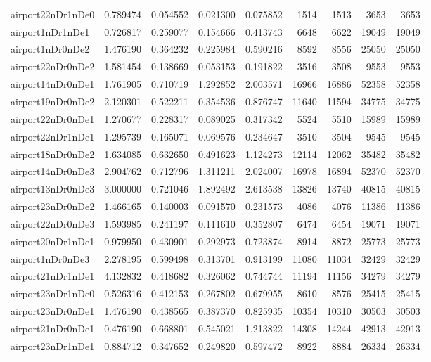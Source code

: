 \begin{longtable}{|l|r|r|r|r|r|r|r|r|}
airport22nDr1nDe0 & 0.789474 & 0.054552 & 0.021300 & 0.075852 & 1514 & 1513 & 3653 & 3653 \\
airport1nDr1nDe1 & 0.726817 & 0.259077 & 0.154666 & 0.413743 & 6648 & 6622 & 19049 & 19049 \\
airport1nDr0nDe2 & 1.476190 & 0.364232 & 0.225984 & 0.590216 & 8592 & 8556 & 25050 & 25050 \\
airport22nDr0nDe2 & 1.581454 & 0.138669 & 0.053153 & 0.191822 & 3516 & 3508 & 9553 & 9553 \\
airport14nDr0nDe1 & 1.761905 & 0.710719 & 1.292852 & 2.003571 & 16966 & 16886 & 52358 & 52358 \\
airport19nDr0nDe2 & 2.120301 & 0.522211 & 0.354536 & 0.876747 & 11640 & 11594 & 34775 & 34775 \\
airport22nDr0nDe1 & 1.270677 & 0.228317 & 0.089025 & 0.317342 & 5524 & 5510 & 15989 & 15989 \\
airport22nDr1nDe1 & 1.295739 & 0.165071 & 0.069576 & 0.234647 & 3510 & 3504 & 9545 & 9545 \\
airport18nDr0nDe2 & 1.634085 & 0.632650 & 0.491623 & 1.124273 & 12114 & 12062 & 35482 & 35482 \\
airport14nDr0nDe3 & 2.904762 & 0.712796 & 1.311211 & 2.024007 & 16978 & 16894 & 52370 & 52370 \\
airport13nDr0nDe3 & 3.000000 & 0.721046 & 1.892492 & 2.613538 & 13826 & 13740 & 40815 & 40815 \\
airport23nDr0nDe2 & 1.466165 & 0.140003 & 0.091570 & 0.231573 & 4086 & 4076 & 11386 & 11386 \\
airport22nDr0nDe3 & 1.593985 & 0.241197 & 0.111610 & 0.352807 & 6474 & 6454 & 19071 & 19071 \\
airport20nDr1nDe1 & 0.979950 & 0.430901 & 0.292973 & 0.723874 & 8914 & 8872 & 25773 & 25773 \\
airport1nDr0nDe3 & 2.278195 & 0.599498 & 0.313701 & 0.913199 & 11080 & 11034 & 32429 & 32429 \\
airport21nDr1nDe1 & 4.132832 & 0.418682 & 0.326062 & 0.744744 & 11194 & 11156 & 34279 & 34279 \\
airport23nDr1nDe0 & 0.526316 & 0.412153 & 0.267802 & 0.679955 & 8610 & 8576 & 25415 & 25415 \\
airport23nDr0nDe1 & 1.476190 & 0.438565 & 0.387370 & 0.825935 & 10354 & 10310 & 30503 & 30503 \\
airport21nDr0nDe1 & 0.476190 & 0.668801 & 0.545021 & 1.213822 & 14308 & 14244 & 42913 & 42913 \\
airport23nDr1nDe1 & 0.884712 & 0.347652 & 0.249820 & 0.597472 & 8922 & 8884 & 26334 & 26334 \\

\end{longtable}

